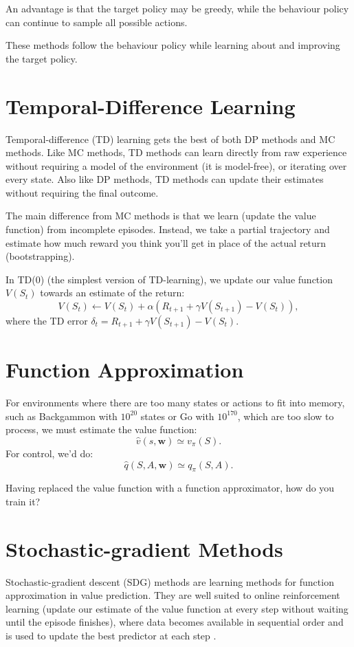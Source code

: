 \documentclass{article}
\begin{document}
An advantage is that the target policy may be greedy, while the
behaviour policy can continue to sample all possible actions.

These methods follow the behaviour policy while learning about and
improving the target policy.

\section{Temporal-Difference Learning}

Temporal-difference (TD) learning gets the best of both DP methods and MC methods. Like MC methods, TD methods can learn directly from raw experience without requiring a model of the environment (it is model-free), or iterating over every state. Also like DP methods, TD methods can update their estimates without requiring the final outcome. 

The main difference from MC methods is that we learn (update the value function) from incomplete episodes. Instead, we take a partial trajectory and estimate how much reward you think you'll get in place of the actual return (bootstrapping).

In TD(0) (the simplest version of TD-learning), we update our value function $V(S_t)$ towards an estimate of the return: $$V(S_t) \leftarrow V(S_t) + \alpha(R_{t+1} + \gamma V(S_{t+1}) - V(S_t)),$$ where the TD error $\delta_t = R_{t+1} + \gamma V(S_{t+1}) - V(S_t)$.

\section{Function Approximation}

For environments where there are too many states or actions to fit into memory, such as Backgammon with $10^{20}$ states or Go with $10^{170}$, which are too slow to process, we must estimate the value function: $$\hat{v}(s, \mathbf{w}) \simeq v_\pi(S).$$ For control, we'd do: $$\hat{q}(S, A, \mathbf{w}) \simeq q_\pi(S, A).$$

Having replaced the value function with a function approximator, how do you train it? 

\section{Stochastic-gradient Methods}

Stochastic-gradient descent (SDG) methods are learning methods for function approximation in value prediction. They are well suited to online reinforcement learning (update our estimate of the value function at every step without waiting until the episode finishes), where data becomes available in sequential order and is used to update the best predictor at each step \cite{Mnih2015}.
\end{document}
